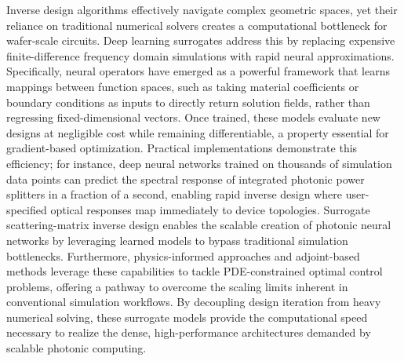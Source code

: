 Inverse design algorithms effectively navigate complex geometric spaces, yet their reliance on traditional numerical solvers creates a computational bottleneck for wafer-scale circuits. Deep learning surrogates address this by replacing expensive finite-difference frequency domain simulations with rapid neural approximations. Specifically, neural operators have emerged as a powerful framework that learns mappings between function spaces, such as taking material coefficients or boundary conditions as inputs to directly return solution fields, rather than regressing fixed-dimensional vectors. \citep{doi_10_48550_arxiv_2303_10506_0452bde4} Once trained, these models evaluate new designs at negligible cost while remaining differentiable, a property essential for gradient-based optimization. Practical implementations demonstrate this efficiency; for instance, deep neural networks trained on thousands of simulation data points can predict the spectral response of integrated photonic power splitters in a fraction of a second, enabling rapid inverse design where user-specified optical responses map immediately to device topologies. Surrogate scattering-matrix inverse design enables the scalable creation of photonic neural networks by leveraging learned models to bypass traditional simulation bottlenecks. \citep{s2_753a5d83a96e0194da93bcb6f20fa0bd356e37fa_c11e3796} Furthermore, physics-informed approaches and adjoint-based methods leverage these capabilities to tackle PDE-constrained optimal control problems, offering a pathway to overcome the scaling limits inherent in conventional simulation workflows. By decoupling design iteration from heavy numerical solving, these surrogate models provide the computational speed necessary to realize the dense, high-performance architectures demanded by scalable photonic computing. \citep{doi_10_48550_arxiv_2601_00199_c689b34d} \citep{doi_10_1038_s41598_018_37952_2_076b64f9} \citep{doi_10_48550_arxiv_2606_12337_68b62bfa}

